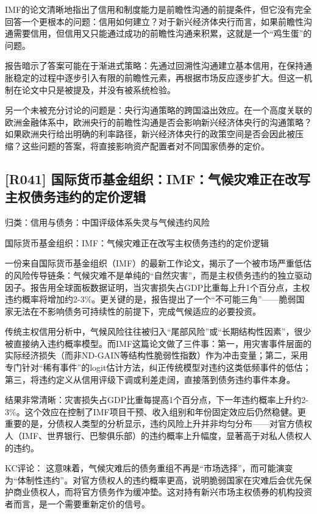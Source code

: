 \documentclass[11pt]{ctexart}
\begin{document}
IMF的论文清晰地指出了信用和制度能力是前瞻性沟通的前提条件，但它没有完全回答一个更根本的问题：信用如何建立？对于新兴经济体央行而言，如果前瞻性沟通需要信用，但信用又只能通过成功的前瞻性沟通来积累，这就是一个“鸡生蛋”的问题。

报告暗示了答案可能在于渐进式策略：先通过回溯性沟通建立基本信用，在保持通胀稳定的过程中逐步引入有限的前瞻性元素，再根据市场反应逐步扩大。但这一机制在论文中只是被提及，并没有被系统检验。

另一个未被充分讨论的问题是：央行沟通策略的跨国溢出效应。在一个高度关联的欧洲金融体系中，欧洲央行的前瞻性沟通是否会影响新兴经济体央行的沟通策略？如果欧洲央行给出明确的利率路径，新兴经济体央行的政策空间是否会因此被压缩？这些问题的答案，将直接影响资产配置者对不同国家债券的定价。

\subsection{[R041] 国际货币基金组织：IMF：气候灾难正在改写主权债务违约的定价逻辑}
{\small\color{refgray}归类：信用与债务：中国评级体系失灵与气候违约风险}

国际货币基金组织：IMF：气候灾难正在改写主权债务违约的定价逻辑

一份来自国际货币基金组织（IMF）的最新工作论文，揭示了一个被市场严重低估的风险传导链条：气候灾难不是单纯的“自然灾害”，而是主权债务违约的独立驱动因子。报告用全球面板数据证明，当灾害损失占GDP比重每上升1个百分点，主权违约概率将增加约2-3\%。更关键的是，报告提出了一个“不可能三角”——脆弱国家无法在不影响债务可持续性的前提下，完成气候适应的必要投资。

传统主权信用分析中，气候风险往往被归入“尾部风险”或“长期结构性因素”，很少被直接纳入违约概率模型。而IMF这篇论文做了三件事：第一，用灾害事件层面的实际经济损失（而非ND-GAIN等结构性脆弱性指数）作为冲击变量；第二，采用专门针对“稀有事件”的logit估计方法，纠正传统模型对违约这类低频事件的低估；第三，将违约定义从信用评级下调或利差走阔，直接落到债务违约事件本身。

结果非常清晰：灾害损失占GDP比重每提高1个百分点，下一年违约概率上升约2-3\%。这个效应在控制了IMF项目干预、收入组别和年份固定效应后仍然稳健。更重要的是，分债权人类型的分析显示，违约风险上升并非均匀分布——对官方债权人（IMF、世界银行、巴黎俱乐部）的违约概率上升幅度，显著高于对私人债权人的违约。

KC评论： 这意味着，气候灾难后的债务重组不再是“市场选择”，而可能演变为“体制性违约”。对官方债权人的违约概率更高，说明脆弱国家在灾难后会优先保护商业债权人，而将官方债务作为缓冲垫。这对持有新兴市场主权债券的机构投资者而言，是一个需要重新定价的信号。
\end{document}
